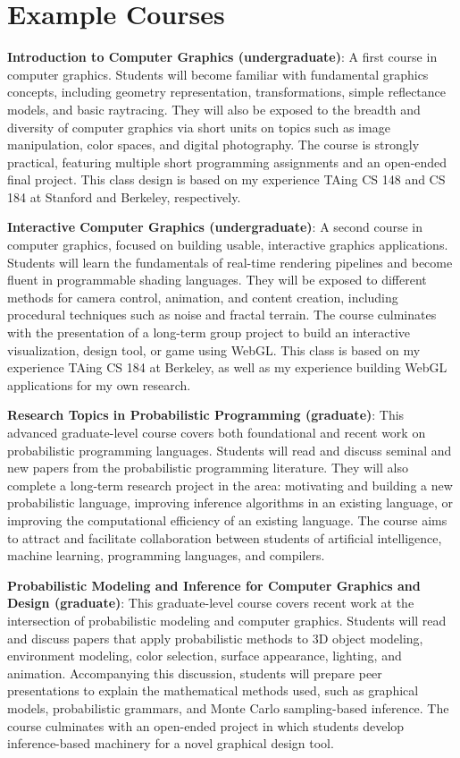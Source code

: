 \documentclass[
10pt, %
a4paper, %
oneside, %
headinclude,footinclude, %
BCOR5mm, %
]{scrartcl}
\begin{document}
\section*{Example Courses}

\textbf{Introduction to Computer Graphics (undergraduate)}:
A first course in computer graphics. Students will become familiar with fundamental graphics concepts, including geometry representation, transformations, simple reflectance models, and basic raytracing. They will also be exposed to the breadth and diversity of computer graphics via short units on topics such as image manipulation, color spaces, and digital photography. The course is strongly practical, featuring multiple short programming assignments and an open-ended final project. This class design is based on my experience TAing CS 148 and CS 184 at Stanford and Berkeley, respectively.

\textbf{Interactive Computer Graphics (undergraduate)}:
A second course in computer graphics, focused on building usable, interactive graphics applications. Students will learn the fundamentals of real-time rendering pipelines and become fluent in programmable shading languages. They will be exposed to different methods for camera control, animation, and content creation, including procedural techniques such as noise and fractal terrain. The course culminates with the presentation of a long-term group project to build an interactive visualization, design tool, or game using WebGL. This class is based on my experience TAing CS 184 at Berkeley, as well as my experience building WebGL applications for my own research.

\textbf{Research Topics in Probabilistic Programming (graduate)}:
This advanced graduate-level course covers both foundational and recent work on probabilistic programming languages. Students will read and discuss seminal and new papers from the probabilistic programming literature. They will also complete a long-term research project in the area: motivating and building a new probabilistic language, improving inference algorithms in an existing language, or improving the computational efficiency of an existing language. The course aims to attract and facilitate collaboration between students of artificial intelligence, machine learning, programming languages, and compilers.

\textbf{Probabilistic Modeling and Inference for Computer Graphics and Design (graduate)}:
This graduate-level course covers recent work at the intersection of probabilistic modeling and computer graphics. Students will read and discuss papers that apply probabilistic methods to 3D object modeling, environment modeling, color selection, surface appearance, lighting, and animation. Accompanying this discussion, students will prepare peer presentations to explain the mathematical methods used, such as graphical models, probabilistic grammars, and Monte Carlo sampling-based inference. The course culminates with an open-ended project in which students develop inference-based machinery for a novel graphical design tool.
\end{document}

